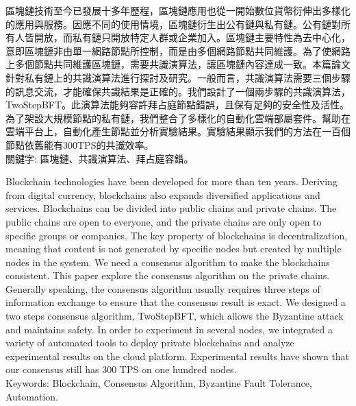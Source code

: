 \begin{abstractzh}
區塊鏈技術至今已發展十多年歷程，區塊鏈應用也從一開始數位貨幣衍伸出多樣化的應用與服務。因應不同的使用情境，區塊鏈衍生出公有鏈與私有鏈。公有鏈對所有人皆開放，而私有鏈只開放特定人群或企業加入。區塊鏈主要特性為去中心化，意即區塊鏈非由單一網路節點所控制，而是由多個網路節點共同維護。為了使網路上多個節點共同維護區塊鏈，需要共識演算法，讓區塊鏈內容達成一致。本篇論文針對私有鏈上的共識演算法進行探討及研究。一般而言，共識演算法需要三個步驟的訊息交流，才能確保共識結果是正確的。我們設計了一個兩步驟的共識演算法，TwoStep­BFT。此演算法能夠容許拜占庭節點錯誤，且保有足夠的安全性及活性。為了架設大規模節點的私有鏈，我們整合了多樣化的自動化雲端部屬套件。幫助在雲端平台上，自動化產生節點並分析實驗結果。實驗結果顯示我們的方法在一百個節點依舊能有300TPS的共識效率。\\

\noindent
關鍵字: 區塊鏈、共識演算法、拜占庭容錯。 
\end{abstractzh}

\begin{abstracten}
Blockchain technologies have been developed for more than ten years. Deriving from digital currency, blockchains also expands diversified applications and services. Blockchains can be divided into public chains and private chains. The public chains are open to everyone, and the private chains are only open to specific groups or companies. The key property of blockchains is decentralization, meaning that content is not generated by specific nodes but created by multiple nodes in the system. We need a consensus algorithm to make the blockchains consistent. This paper explore the consensus algorithm on the private chains. Generally speaking, the consensus algorithm usually requires three steps of information exchange to ensure that the consensus result is exact. We designed a two steps consensus algorithm, TwoStepBFT, which allows the Byzantine attack and maintains safety. In order to experiment in several nodes, we integrated a variety of automated tools to deploy private blockchains and analyze experimental results on the cloud platform. Experimental results have shown that our consensus still has 300 TPS on one hundred nodes. \\
	
\noindent
Keywords: Blockchain, Consensus Algorithm, Byzantine Fault Tolerance, Automation. 
\end{abstracten}
